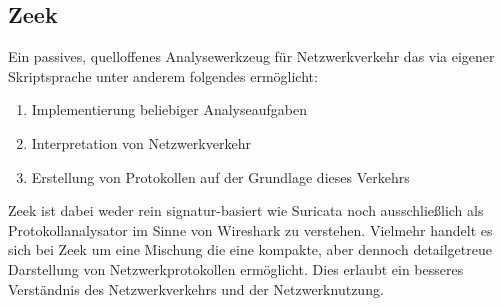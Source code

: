 \subsection{Zeek}
Ein passives, quelloffenes Analysewerkzeug für Netzwerkverkehr das via eigener  Skriptsprache unter anderem folgendes ermöglicht:
\begin{enumerate}
\item{Implementierung beliebiger Analyseaufgaben}
\item{Interpretation von Netzwerkverkehr}
\item{Erstellung von Protokollen auf der Grundlage dieses Verkehrs}
\end{enumerate}
Zeek ist dabei weder rein signatur-basiert wie Suricata noch ausschließlich als Protokollanalysator im Sinne von Wireshark zu verstehen. Vielmehr handelt es sich bei Zeek um eine Mischung die eine kompakte, aber dennoch detailgetreue Darstellung von Netzwerkprotokollen ermöglicht. Dies erlaubt ein besseres Verständnis des Netzwerkverkehrs und der Netzwerknutzung.

